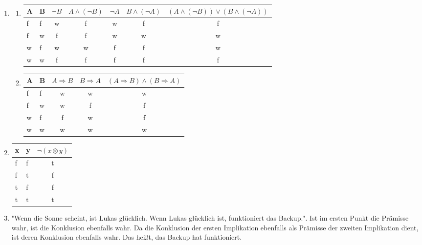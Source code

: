 \documentclass[a4paper]{article}
\begin{document}
\begin{enumerate}
		\item
		\begin{enumerate}
			\item
			\begin{tabular}{|l|l|c|c|c|c|c|}
				\firsthline
					A & B & $\lnot B$ & $A \land (\lnot B)$ & $\lnot A$ & $B \land (\lnot A)$ & $(A \land (\lnot B)) \lor (B \land (\lnot A))$ \\
				\hline
					f & f & w & f & w & f & f \\
					f & w & f & f & w & w & w \\
					w & f & w & w & f & f & w \\
					w & w & f & f & f & f & f \\
				\hline
			\end{tabular}
			
			\item
			\begin{tabular}{|l|l|c|c|c|}
				\firsthline
				A & B & $A \Rightarrow B$ & $B \Rightarrow A$ & $(A \Rightarrow B) \land (B \Rightarrow A)$ \\
				\hline
				f & f & w & w & w \\
				f & w & w & f & f \\
				w & f & f & w & f \\
				w & w & w & w & w \\
				\hline
			\end{tabular}
		\end{enumerate}
		
		\item
		\begin{tabular}{|l|l|c|}
			\firsthline
			x & y & $\lnot (x \otimes y)$ \\
			\hline
			f & f & t \\
			f & t & f \\
			t & f & f \\
			t & t & t \\
			\hline
		\end{tabular}
		
		\item
		"Wenn die Sonne scheint, ist Lukas glücklich. Wenn Lukas glücklich ist, funktioniert das Backup.". Ist im ersten Punkt die Prämisse wahr, ist die Konklusion ebenfalls wahr. Da die Konklusion der ersten Implikation ebenfalls als Prämisse der zweiten Implikation dient, ist deren Konklusion ebenfalls wahr. Das heißt, das Backup hat funktioniert.
	\end{enumerate}
\end{document}
